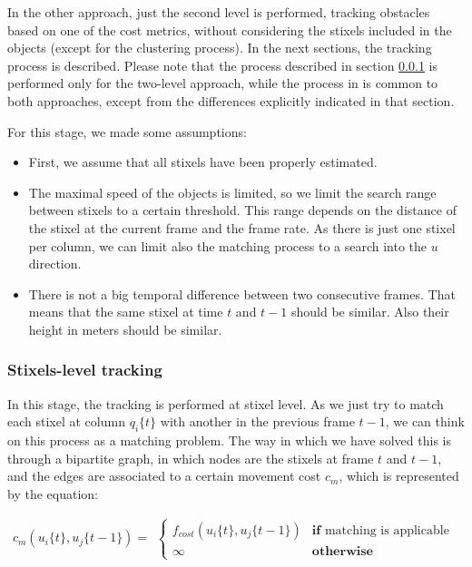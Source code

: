 In the other approach, just the second level is performed, tracking obstacles based on one of the cost metrics, without considering the stixels included in the objects (except for the clustering process). In the next sections, the tracking process is described. Please note that the process described in section \ref{ch:chapter04_01_03_01} is performed only for the two-level approach, while the process in \label{ch:chapter04_01_04} is common to both approaches, except from the differences explicitly indicated in that section.

For this stage, we made some assumptions:
\begin{itemize}
 \item First, we assume that all stixels have been properly estimated.
 \item The maximal speed of the objects is limited, so we limit the search range between stixels to a certain threshold. This range depends on the distance of the stixel at the current frame and the frame rate. As there is just one stixel per column, we can limit also the matching process to a search into the $u$ direction.
 \item There is not a big temporal difference between two consecutive frames. That means that the same stixel at time $t$ and $t - 1$ should be similar. Also their height in meters should be similar. 
\end{itemize}

\subsubsection{Stixels-level tracking}\label{ch:chapter04_01_03_01}

In this stage, the tracking is performed at stixel level. As we just try to match each stixel at column $q_i\{t\}$ with another in the previous frame $t - 1$, we can think on this process as a matching problem. The way in which we have solved this is through a bipartite graph, in which nodes are the stixels at frame $t$ and $t - 1$, and the edges are associated to a certain movement cost $c_m$, which is represented by the equation:

\begin{equation}\label{eq:cp04_stixel_movement_cost}
  c_m(u_i\{t\}, u_j\{t - 1\}) = 
  \begin{align*}
    \begin{cases}
    f_{cost}(u_i\{t\}, u_j\{t - 1\}) & \textbf{if} \text{ matching is applicable} \\
    \infty & \textbf{otherwise}
    \end{cases}
  \end{align*}
\end{equation}

